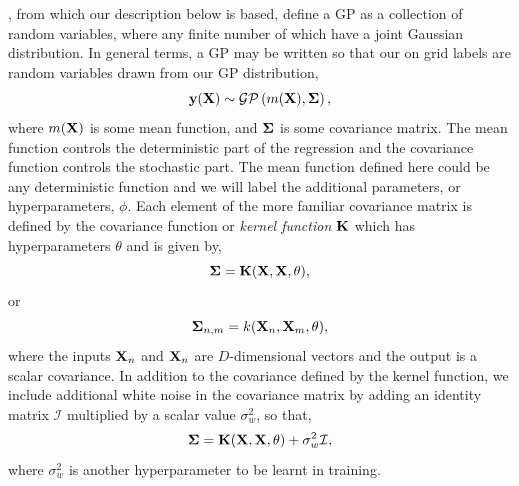 \citet{williams1996gaussian}, from which our description below is based,  define a GP as a collection of random variables, where any finite number of which have a joint Gaussian distribution.  In general terms,  a GP may be written so that our on grid labels are random variables drawn from our GP distribution, 
\begin{equation}
{\bf y}({\bf X}) \sim \mathcal{GP}\left( m({\bf X}),  {\bf \Sigma}\right),
\end{equation}
where $m({\bf X})$ is some mean function, and $\bf \Sigma$ is some covariance matrix.  The mean function controls the deterministic part of the regression and the covariance function controls the stochastic part.  The mean function defined here could be any deterministic function and we will label the additional parameters, or hyperparameters, $\phi$.  Each element of the more familiar covariance matrix is defined by the covariance function or {\it kernel function} $\bf K$ which has hyperparameters $\theta$ and is given by,
\begin{equation}
{\bf \Sigma} = {\bf K}({\bf X}, {\bf X},  \theta),
\end{equation}
or 
\begin{equation}
{\bf \Sigma}_{n, m} = k({\bf X}_{n}, {\bf X}_{m},  \theta),
\end{equation}
where the inputs ${\bf X}_{n}$ and ${\bf X}_{n}$ are $D$-dimensional vectors and the output is a scalar covariance.
In addition to the covariance defined by the kernel function, we include additional white noise in the covariance matrix by adding an identity matrix $\mathcal{I}$ multiplied by a scalar value $\sigma_{w}^2$, so that, 
\begin{equation}
{\bf \Sigma} = {\bf K}({\bf X}, {\bf X},  \theta) + \sigma_{w}^{2} \mathcal{I},
\end{equation}
where $\sigma_{w}^2$ is another hyperparameter to be learnt in training. 

